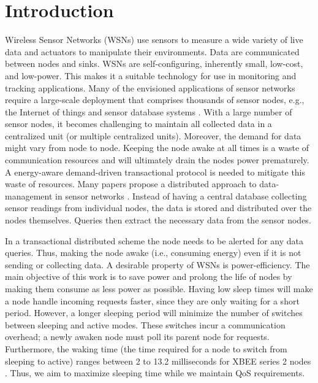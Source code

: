\section{Introduction}\label{sec:Intro}

Wireless Sensor Networks (WSNs) use sensors to measure a wide variety of live data and actuators to manipulate their environments. Data are communicated between nodes and sinks. WSNs are self-configuring, inherently small, low-cost, and low-power. This makes it a suitable technology for use in monitoring and tracking applications. Many of the envisioned applications of sensor networks require a large-scale deployment that comprises thousands of sensor nodes, e.g., the Internet of things \cite{22} and sensor database systems \cite{2}. With a large number of sensor nodes, it becomes challenging to maintain all collected data in a centralized unit (or multiple centralized units). Moreover, the demand for data might vary from node to node. Keeping the node awake at all times is a waste of communication resources and will ultimately drain the nodes power prematurely. A energy-aware demand-driven transactional protocol is needed to mitigate this waste of resources. Many papers propose a distributed approach to data-management in sensor networks \cite{2,4.11,23}. Instead of having a central database collecting sensor readings from individual nodes, the data is stored and distributed over the nodes themselves. Queries then extract the necessary data from the sensor nodes. 

In a transactional distributed scheme the node needs to be alerted for any data queries. Thus, making the node awake (i.e., consuming energy) even if it is not sending or collecting data. A desirable property of WSNs is power-efficiency. The main objective of this work is to save power and prolong the life of nodes by making them consume as less power as possible. Having low sleep times will make a node handle incoming requests faster, since they are only waiting for a short period. However, a longer sleeping period will minimize the number of switches between sleeping and active modes. These switches incur a communication overhead; a newly awaken node must poll its parent node for requests. Furthermore, the waking time (the time required for a node to switch from sleeping to active) ranges between 2 to 13.2 milliseconds for XBEE series 2 nodes \cite{19}. Thus, we aim to maximize sleeping time while we maintain QoS requirements.

